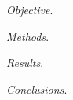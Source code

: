 


\begin{abstracts}        %
	\thispagestyle{plain} %
	
	\noindent \textit{Objective}. 
	
	\noindent \textit{Methods}. 

	\noindent \textit{Results}. 
	
	\noindent \textit{Conclusions}. 
	
\end{abstracts}


